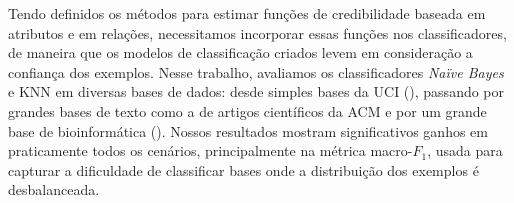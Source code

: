 Tendo definidos os métodos para estimar funções de credibilidade baseada em atributos e em relações, necessitamos incorporar essas funções nos classificadores, de maneira que os modelos de classificação criados levem em consideração a confiança dos exemplos. Nesse trabalho, avaliamos os classificadores \textit{Naïve Bayes} e \textsc{KNN} em diversas bases de dados: desde simples bases da \textsc{UCI} (\cite{UCI98}), passando por grandes bases de texto como a de artigos científicos da \textsc{ACM} e por um grande base de bioinformática (\cite{dpires_bmc_2011}).
Nossos resultados mostram significativos ganhos em praticamente todos os cenários, principalmente na métrica macro-$F_1$, usada para capturar a dificuldade de classificar bases onde a distribuição dos exemplos é desbalanceada.








